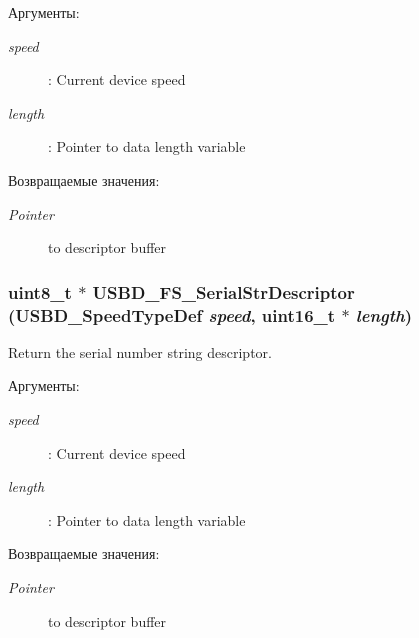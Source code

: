 \begin{Desc}
\item[Аргументы:]
\begin{description}
\item[{\em speed}]: Current device speed \item[{\em length}]: Pointer to data length variable \end{description}
\end{Desc}
\begin{Desc}
\item[Возвращаемые значения:]
\begin{description}
\item[{\em Pointer}]to descriptor buffer \end{description}
\end{Desc}
\hypertarget{group___u_s_b_d___d_e_s_c___private___functions_gad2a1d1451821845eda602a82b1cd213}{
\subsubsection[{USBD\_\-FS\_\-SerialStrDescriptor}]{\setlength{\rightskip}{0pt plus 5cm}uint8\_\-t $\ast$ USBD\_\-FS\_\-SerialStrDescriptor (USBD\_\-SpeedTypeDef {\em speed}, \/  uint16\_\-t $\ast$ {\em length})}}
\label{group___u_s_b_d___d_e_s_c___private___functions_gad2a1d1451821845eda602a82b1cd213}


Return the serial number string descriptor. 

\begin{Desc}
\item[Аргументы:]
\begin{description}
\item[{\em speed}]: Current device speed \item[{\em length}]: Pointer to data length variable \end{description}
\end{Desc}
\begin{Desc}
\item[Возвращаемые значения:]
\begin{description}
\item[{\em Pointer}]to descriptor buffer \end{description}
\end{Desc}
